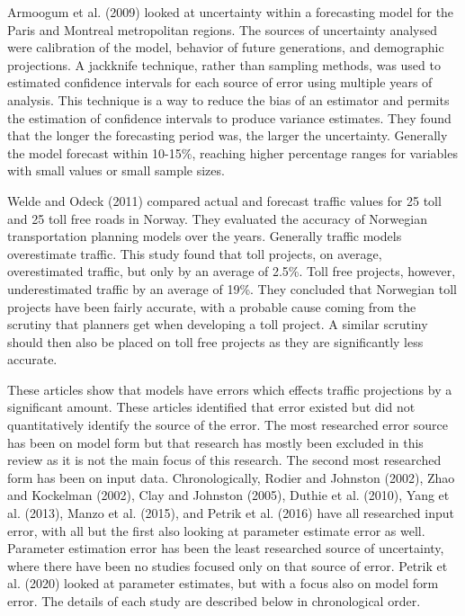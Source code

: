 \documentclass[
  futuretransp,
  submit,
  moreauthors,
]{Definitions/mdpi}
\begin{document}
Armoogum et al. (2009) looked at uncertainty within a forecasting model
for the Paris and Montreal metropolitan regions. The sources of
uncertainty analysed were calibration of the model, behavior of future
generations, and demographic projections. A jackknife technique, rather
than sampling methods, was used to estimated confidence intervals for
each source of error using multiple years of analysis. This technique is
a way to reduce the bias of an estimator and permits the estimation of
confidence intervals to produce variance estimates. They found that the
longer the forecasting period was, the larger the uncertainty. Generally
the model forecast within 10-15\%, reaching higher percentage ranges for
variables with small values or small sample sizes.

Welde and Odeck (2011) compared actual and forecast traffic values for
25 toll and 25 toll free roads in Norway. They evaluated the accuracy of
Norwegian transportation planning models over the years. Generally
traffic models overestimate traffic. This study found that toll
projects, on average, overestimated traffic, but only by an average of
2.5\%. Toll free projects, however, underestimated traffic by an average
of 19\%. They concluded that Norwegian toll projects have been fairly
accurate, with a probable cause coming from the scrutiny that planners
get when developing a toll project. A similar scrutiny should then also
be placed on toll free projects as they are significantly less accurate.

These articles show that models have errors which effects traffic
projections by a significant amount. These articles identified that
error existed but did not quantitatively identify the source of the
error. The most researched error source has been on model form but that
research has mostly been excluded in this review as it is not the main
focus of this research. The second most researched form has been on
input data. Chronologically, Rodier and Johnston (2002), Zhao and
Kockelman (2002), Clay and Johnston (2005), Duthie et al. (2010), Yang
et al. (2013), Manzo et al. (2015), and Petrik et al. (2016) have all
researched input error, with all but the first also looking at parameter
estimate error as well. Parameter estimation error has been the least
researched source of uncertainty, where there have been no studies
focused only on that source of error. Petrik et al. (2020) looked at
parameter estimates, but with a focus also on model form error. The
details of each study are described below in chronological order.
\end{document}
